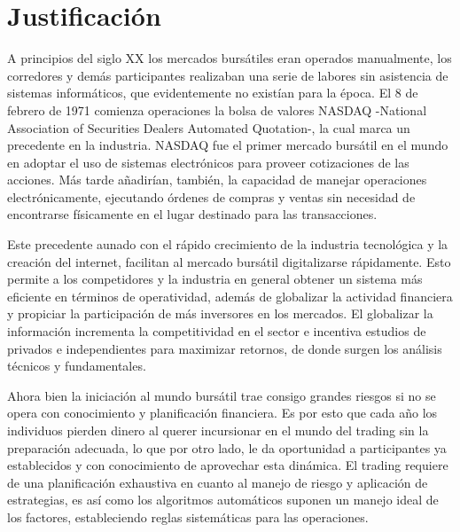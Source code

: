 \documentclass[a4paper,12pt]{Latex/Classes/PhDthesisPSnPDF}
\begin{document}
\section{Justificación}

A principios del siglo XX los mercados bursátiles eran operados manualmente, los corredores y demás participantes realizaban una serie de labores sin asistencia de sistemas informáticos, que evidentemente no existían para la época. El 8 de febrero de 1971 comienza operaciones la bolsa de valores NASDAQ -National Association of Securities Dealers Automated Quotation-, la cual marca un precedente en la industria. NASDAQ fue el primer mercado bursátil en el mundo en adoptar el uso de sistemas electrónicos para proveer cotizaciones de las acciones. Más tarde añadirían, también, la capacidad de manejar operaciones electrónicamente, ejecutando órdenes de compras y ventas sin necesidad de encontrarse físicamente en el lugar destinado para las transacciones.

Este precedente aunado con el rápido crecimiento de la industria tecnológica y la creación del internet, facilitan al mercado bursátil digitalizarse rápidamente. Esto permite a los competidores y la industria en general obtener un sistema más eficiente en términos de operatividad, además de globalizar la actividad financiera y propiciar la participación de más inversores en los mercados. El globalizar la información incrementa la competitividad en el sector e incentiva estudios de privados e independientes para maximizar retornos, de donde surgen los análisis técnicos y fundamentales.

Ahora bien la iniciación al mundo bursátil trae consigo grandes riesgos si no se opera con conocimiento y planificación financiera. Es por esto que cada año los individuos pierden dinero al querer incursionar en el mundo del trading sin la preparación adecuada, lo que por otro lado, le da oportunidad a participantes ya establecidos y con conocimiento de aprovechar esta dinámica. El trading requiere de una planificación exhaustiva en cuanto al manejo de riesgo y aplicación de estrategias, es así como los algoritmos automáticos suponen un manejo ideal de los factores, estableciendo reglas sistemáticas para las operaciones.
\end{document}

